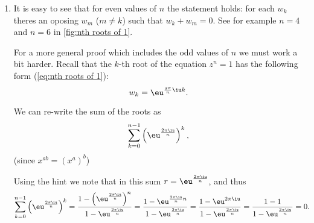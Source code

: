 \begin{enumerate}

	\item It is easy to see that for even values of $n$ the statement holds: for each $w_{k}$ theres an oposing $w_{m}$ ($m\neq k$) such that $w_{k}+w_{m}=0$. See for example $n=4$ and $n=6$ in \autoref{fig:nth roots of 1}.

		For a more general proof which includes the odd values of $n$ we must work a bit harder. Recall that the $k$-th root of the equation $z^{n}=1$ has the following form (\autoref{eq:nth roots of 1}):
		\[
			w_{k} = \eu^{\frac{2\pi}{n}\iu k}.
		\]

		We can re-write the sum of the roots as
		\[
			\sum\limits_{k=0}^{n-1} \left(\eu^{\frac{2\pi\iu}{n}}\right)^{k},
		\]
		(since $x^{ab} = (x^{a})^{b}$)

		Using the hint we note that in this sum $r=\eu^{\frac{2\pi\iu}{n}}$, and thus
		\def\lsk{1.25\normalbaselineskip}
		\begin{align*}
			\sum\limits_{k=0}^{n-1} \left( \eu^{\frac{2\pi\iu}{n}} \right)^{k} &= \frac{1-\left(\eu^{\frac{2\pi\iu}{n}}\right)^{n}}{1-\eu^{\frac{2\pi\iu}{n}}} = \frac{1-\eu^{\frac{2\pi\iu}{n}n}}{1-\eu^{\frac{2\pi\iu}{n}}} = \frac{1-\eu^{2\pi\iu}}{1-\eu^{\frac{2\pi\iu}{n}}} = \frac{1-1}{1-\eu^{\frac{2\pi\iu}{n}}} = 0.
		\end{align*}
\end{enumerate}
